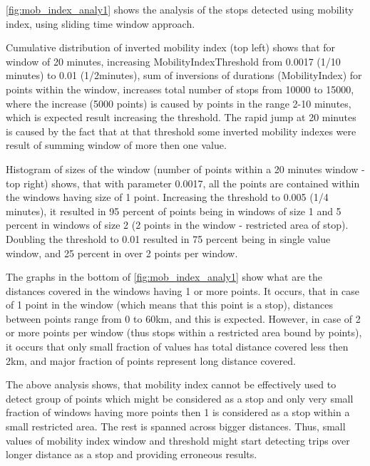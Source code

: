 \autoref{fig:mob_index_analy1} shows the analysis of the stops detected using mobility index, using sliding time window approach.

Cumulative distribution of inverted mobility index (top left) shows that for window of 20 minutes, increasing MobilityIndexThreshold from 0.0017 (1/10 minutes) to 0.01 (1/2minutes), sum of inversions of durations (MobilityIndex) for points within the window, increases total number of stops from 10000 to 15000, where the increase (5000 points) is caused by points in the range 2-10 minutes, which is expected result increasing the threshold. The rapid jump at 20 minutes is caused by the fact that at that threshold some inverted mobility indexes were result of summing window of more then one value. 

Histogram of sizes of the window (number of points within a 20 minutes window - top right) shows, that with parameter 0.0017, all the points are contained within the windows having size of 1 point. Increasing the threshold to 0.005 (1/4 minutes), it resulted in 95 percent of points being in windows of size 1 and 5 percent in windows of size 2 (2 points in the window - restricted area of stop). Doubling the threshold to 0.01 resulted in 75 percent being in single value window, and 25 percent in over 2 points per window. 

The graphs in the bottom of \autoref{fig:mob_index_analy1} show what are the distances covered in the windows having 1 or more points. It occurs, that in case of 1 point in the window (which means that this point is a stop), distances between points range from 0 to 60km, and this is expected. However, in case of 2 or more points per window (thus stops within a restricted area bound by points), it occurs that only small fraction of values has total distance covered less then 2km, and major fraction of points represent long distance covered. 

The above analysis shows, that mobility index cannot be effectively used to detect group of points which might be considered as a stop and only very small fraction of windows having more points then 1 is considered as a stop within a small restricted area. The rest is spanned across bigger distances. Thus, small values of mobility index window and threshold might start detecting trips over longer distance as a stop and providing erroneous results. 
  
